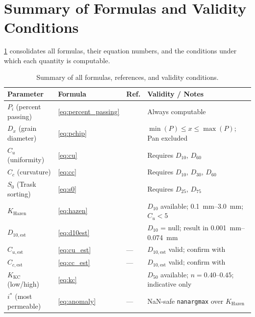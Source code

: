 \documentclass[12pt,a4paper]{article}
\begin{document}
\section{Summary of Formulas and Validity Conditions}
\label{sec:summary}

\cref{tab:summary} consolidates all formulas, their equation numbers, and the
conditions under which each quantity is computable.

\begin{table}[H]
    \centering
    \caption{Summary of all formulas, references, and validity conditions.}
    \label{tab:summary}
    \renewcommand{\arraystretch}{1.35}
    \begin{tabularx}{\linewidth}{l l l X}
        \toprule
        Parameter & Formula & Ref. & Validity / Notes \\
        \midrule
        $P_i$ (percent passing)
            & \eqref{eq:percent_passing}
            & \citep{astm_d6913}
            & Always computable \\
        $D_x$ (grain diameter)
            & \eqref{eq:pchip}
            & \citep{fritsch1980}
            & $\min(P) \le x \le \max(P)$; Pan excluded \\
        $C_u$ (uniformity)
            & \eqref{eq:cu}
            & \citep{astm_d2487}
            & Requires $D_{10}$, $D_{60}$ \\
        $C_c$ (curvature)
            & \eqref{eq:cc}
            & \citep{astm_d2487}
            & Requires $D_{10}$, $D_{30}$, $D_{60}$ \\
        $S_0$ (Trask sorting)
            & \eqref{eq:s0}
            & \citep{trask1932}
            & Requires $D_{25}$, $D_{75}$ \\
        $K_{\mathrm{Hazen}}$
            & \eqref{eq:hazen}
            & \citep{hazen1911}
            & $D_{10}$ available; \SIrange{0.1}{3.0}{\milli\metre}; $C_u < 5$ \\
        $D_{10,\mathrm{est}}$
            & \eqref{eq:d10est}
            & \citep{astm_d2487}
            & $D_{10}$ = null; result in \SIrange{0.001}{0.074}{\milli\metre} \\
        $C_{u,\mathrm{est}}$
            & \eqref{eq:cu_est}
            & ---
            & $D_{10,\mathrm{est}}$ valid; confirm with \citet{astm_d7928} \\
        $C_{c,\mathrm{est}}$
            & \eqref{eq:cc_est}
            & ---
            & $D_{10,\mathrm{est}}$ valid; confirm with \citet{astm_d7928} \\
        $K_{\mathrm{KC}}$ (low/high)
            & \eqref{eq:kc}
            & \citep{kozeny1927, carman1937}
            & $D_{50}$ available; $n = 0.40$--$0.45$; indicative only \\
        $i^{*}$ (most permeable)
            & \eqref{eq:anomaly}
            & ---
            & NaN-safe \texttt{nanargmax} over $K_{\mathrm{Hazen}}$ \\
        \bottomrule
    \end{tabularx}
\end{table}



\end{document}
